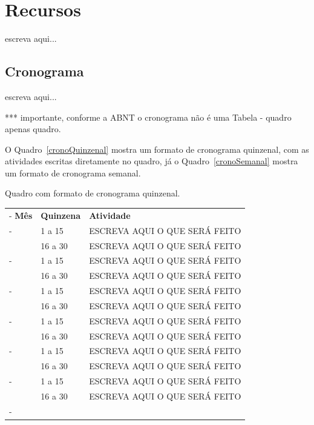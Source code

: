 \section{\label{sec:rec}Recursos}
escreva aqui... 

\subsection{\label{sec:cronos}Cronograma}
escreva aqui...

*** importante, conforme a ABNT o cronograma não é uma Tabela - quadro apenas quadro.

O Quadro~\ref{cronoQuinzenal} mostra um formato de cronograma quinzenal, com as atividades escritas diretamente no quadro, já o Quadro~\ref{cronoSemanal} mostra um formato de cronograma semanal.

\begin{quadro}[htb]
	\smaller
	\caption{\label{cronoQuinzenal}Quadro com formato de cronograma quinzenal.}	
	\begin{tabu}{|X[c 0.25]|X[c 0.5]|X[3]|} \tabucline-
		\textbf{Mês} 	& \textbf{Quinzena}	&	\textbf{Atividade} \\ \tabucline-
			& 	1 a 15		& ESCREVA AQUI O QUE SERÁ FEITO \\ 
		& 	16 a 30		& ESCREVA AQUI O QUE SERÁ FEITO    \\ \tabucline-
			& 	1 a 15		& ESCREVA AQUI O QUE SERÁ FEITO    \\ 
		& 	16 a 30		& ESCREVA AQUI O QUE SERÁ FEITO    \\ \tabucline-
			& 	1 a 15		& ESCREVA AQUI O QUE SERÁ FEITO    \\ 
		& 	16 a 30		& ESCREVA AQUI O QUE SERÁ FEITO    \\ \tabucline-
			& 	1 a 15		& ESCREVA AQUI O QUE SERÁ FEITO    \\ 
		& 	16 a 30		& ESCREVA AQUI O QUE SERÁ FEITO    \\ \tabucline-
			& 	1 a 15		& ESCREVA AQUI O QUE SERÁ FEITO    \\ 
		& 	16 a 30		& ESCREVA AQUI O QUE SERÁ FEITO    \\ \tabucline-
			& 	1 a 15		& ESCREVA AQUI O QUE SERÁ FEITO    \\ 
		& 	16 a 30		& ESCREVA AQUI O QUE SERÁ FEITO    \\ \tabucline-		
	\end{tabu}
\end{quadro}


